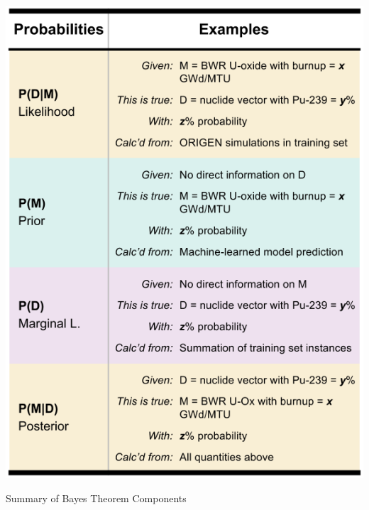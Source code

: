 \begin{table}[!hp]
  \centering
  \includegraphics[width=\linewidth]{./chapters/litrev/bayes.png}
  \caption{Summary of Bayes Theorem Components}
  \label{tbl:bayes}
\end{table}

